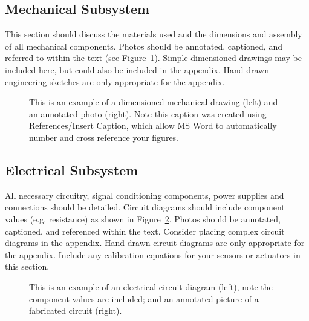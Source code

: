 \documentclass{wsecapstone}
\begin{document}
\subsection{Mechanical Subsystem}
This section should discuss the materials used and the dimensions and assembly of all mechanical components. Photos should be annotated, captioned, and referred to within the text (see Figure~\ref{f1}). Simple dimensioned drawings may be included here, but could also be included in the appendix. Hand-drawn engineering sketches are only appropriate for the appendix.
\begin{figure}
\caption{This is an example of a dimensioned mechanical drawing (left) and an annotated photo (right).   Note this caption was created using References/Insert Caption, which allow MS Word to automatically number and cross reference your figures.}
\label{f1}
\end{figure}

\subsection{Electrical Subsystem}
All necessary circuitry, signal conditioning components, power supplies and connections should be detailed.  Circuit diagrams should include component values (e.g. resistance) as shown in Figure~\ref{f2}. Photos should be annotated, captioned, and referenced within the text. Consider placing complex circuit diagrams in the appendix. Hand-drawn circuit diagrams are only appropriate for the appendix.   Include any calibration equations for your sensors or actuators in this section. 
\begin{figure}
\caption{This is an example of an electrical circuit diagram (left), note the component values are included; and an annotated picture of a fabricated circuit (right).}
\label{f2}
\end{figure}
\end{document}
